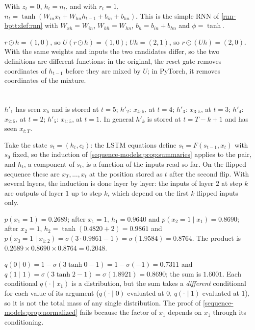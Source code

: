 With $z_t = 0$, $h_t = n_t$, and with $r_t = 1$, $n_t = \tanh(W_{in}x_t + W_{hn}h_{t-1} + b_{in} + b_{hn})$. This is the simple RNN of
\cref{rnn-bptt:def:rnn} with $W_{xh} = W_{in}$, $W_{hh} = W_{hn}$, $b_h = b_{in} + b_{hn}$ and $\phi = \tanh$.

$r\odot h = (1, 0)$, so $U(r\odot h) = (1, 0)$; $Uh = (2, 1)$, so $r\odot(Uh) = (2, 0)$. With the same weights and inputs the two candidates
differ, so the two definitions are different functions: in the original, the reset gate
removes coordinates of $h_{t-1}$ before they are mixed by $U$; in PyTorch, it removes coordinates of the
mixture.

\section{}

$h'_1$ has seen $x_5$ and is stored at $t = 5$; $h'_2$: $x_{4:5}$, at $t = 4$; $h'_3$: $x_{3:5}$, at $t = 3$; $h'_4$: $x_{2:5}$, at $t = 2$; $h'_5$: $x_{1:5}$, at $t = 1$. In
general $h'_k$ is stored at $t = T - k + 1$ and has seen $x_{t:T}$.

Take the state $s_t = (h_t, c_t)$: the LSTM equations define $s_t = F(s_{t-1}, x_t)$ with $s_0$ fixed, so the induction of
\cref{sequence-models:prop:summaries} applies to the pair, and $h_t$, a component of $s_t$, is a function of
the inputs read so far. On the flipped sequence these are $x_T,\dots,x_t$ at the position stored as $t$
after the second flip. With several layers, the induction is done layer by layer: the
inputs of layer $2$ at step $k$ are outputs of layer $1$ up to step $k$, which depend on the first $k$ flipped
inputs only.

$p(x_1 = 1) = 0.2689$; after $x_1 = 1$, $h_1 = 0.9640$ and $p(x_2 = 1\mid x_1) = 0.8690$; after $x_2 = 1$, $h_2 = \tanh(0.4820 + 2) = 0.9861$ and
$p(x_3 = 1\mid x_{1:2}) = \sigma(3\cdot0.9861 - 1) = \sigma(1.9584) = 0.8764$. The product is $0.2689\times0.8690\times0.8764 = 0.2048$.

$q(0\mid0) = 1 - \sigma(3\tanh0 - 1) = 1 - \sigma(-1) = 0.7311$ and $q(1\mid1) = \sigma(3\tanh2 - 1) = \sigma(1.8921) = 0.8690$; the sum is $1.6001$. Each
conditional $q(\cdot\mid x_1)$ is a distribution, but the sum takes a \emph{different} conditional for each value
of its argument ($q(\cdot\mid0)$ evaluated at $0$, $q(\cdot\mid1)$ evaluated at $1$), so it is not the total mass of
any single distribution. The proof of \cref{sequence-models:prop:normalized} fails because the
factor of $x_1$ depends on $x_1$ through its conditioning.

